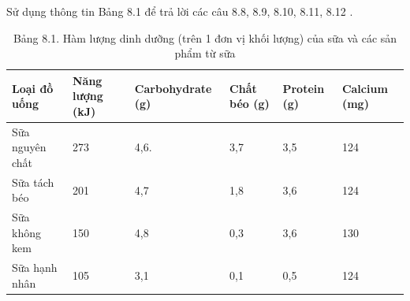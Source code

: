 \documentclass[10pt]{article}
\begin{document}
Sử dụng thông tin Bảng 8.1 để trả lời các câu 8.8, 8.9, 8.10, 8.11, 8.12 .

\begin{table}[h]
\begin{center}
\captionsetup{labelformat=empty}
\caption{Bảng 8.1. Hàm lượng dinh dưỡng (trên 1 đơn vị khối lượng) của sữa và các sản phẩm từ sữa}
\begin{tabular}{|l|l|l|l|l|l|}
\hline
Loại đồ uống & Năng lượng (kJ) & Carbohydrate (g) & Chất béo (g) & Protein (g) & Calcium (mg) \\
\hline
Sữa nguyên chất & 273 & 4,6. & 3,7 & 3,5 & 124 \\
\hline
Sữa tách béo & 201 & 4,7 & 1,8 & 3,6 & 124 \\
\hline
Sữa không kem & 150 & 4,8 & 0,3 & 3,6 & 130 \\
\hline
Sữa hạnh nhân & 105 & 3,1 & 0,1 & 0,5 & 124 \\
\hline
\end{tabular}
\end{center}
\end{table}
\end{document}
